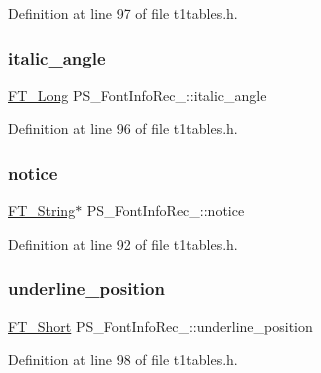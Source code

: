 Definition at line 97 of file t1tables.\+h.

\mbox{\label{struct_p_s___font_info_rec___ab558a75a56fadd54dfc71dcbeec1375a}} 
\subsubsection{\texorpdfstring{italic\_angle}{italic\_angle}}
{\footnotesize\ttfamily \mbox{\hyperlink{fttypes_8h_a7fa72a1f0e79fb1860c5965789024d6f}{F\+T\+\_\+\+Long}} P\+S\+\_\+\+Font\+Info\+Rec\+\_\+\+::italic\+\_\+angle}



Definition at line 96 of file t1tables.\+h.

\mbox{\label{struct_p_s___font_info_rec___a63858ebce653f21d9aa2ddc61ee32b80}} 
\subsubsection{\texorpdfstring{notice}{notice}}
{\footnotesize\ttfamily \mbox{\hyperlink{fttypes_8h_a9846214585359eb2ba6bbb0e6de30639}{F\+T\+\_\+\+String}}$\ast$ P\+S\+\_\+\+Font\+Info\+Rec\+\_\+\+::notice}



Definition at line 92 of file t1tables.\+h.

\mbox{\label{struct_p_s___font_info_rec___a772af52d17288d7846e8893e74d55212}} 
\subsubsection{\texorpdfstring{underline\_position}{underline\_position}}
{\footnotesize\ttfamily \mbox{\hyperlink{fttypes_8h_aa7279be89046a2563cd3d4d6651fbdcf}{F\+T\+\_\+\+Short}} P\+S\+\_\+\+Font\+Info\+Rec\+\_\+\+::underline\+\_\+position}



Definition at line 98 of file t1tables.\+h.

